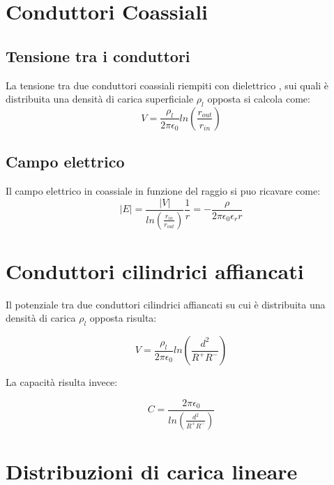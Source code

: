 \documentclass[10pt,a4paper]{report}
\begin{document}
	\section{Conduttori Coassiali}
		\subsection{Tensione tra i conduttori}

		La tensione tra due conduttori coassiali riempiti con dielettrico , sui quali è distribuita una densità di carica superficiale $\rho_l$ opposta si calcola come:
		 \begin{equation}
		 V= \frac {\rho_l}  {2 \pi \epsilon_0} ln ( \frac { r_{out} } { r_{in} } )
		 \end{equation}
	
		\subsection{Campo elettrico}

		Il campo elettrico in coassiale in funzione del raggio si puo ricavare come:
		\begin{equation}
		|E|= \frac {|V|} {ln (\frac {r_{in}} {r_{out}} )} \frac {1} {r} = - \frac{\rho}{2 \pi \epsilon_0 \epsilon_r r}
		\label{eq:campoeletricocoassiale}
		\end{equation}


	\section{Conduttori cilindrici affiancati}

		Il potenziale tra due conduttori cilindrici affiancati su cui è distribuita una densità di carica $\rho_l$ opposta risulta:

		\begin{equation}
		V=\frac{\rho_l}{2 \pi \epsilon_0}{ln(\frac{d^2}{R^+R^-})}
		\label{eq:potenzialebifilari}
		\end{equation}

		La capacità risulta invece:

		\begin{equation}
		C=\frac{2 \pi \epsilon_0}{ln(\frac{d^2}{R^+R^-})}
		\end{equation}

	\section{Distribuzioni di carica lineare}
\end{document}
